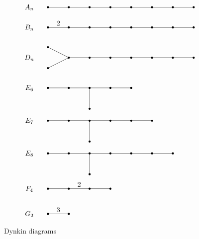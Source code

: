 \documentclass[letterpaper]{amsart}
\numberwithin{equation}{section}
\theoremstyle{definition}
\begin{document}
\begin{figure}[ht] 
\vspace{-.2in} 
\[ 
\begin{array}{ccl} 
A_n && 
\setlength{\unitlength}{1.5pt} 
\begin{picture}(140,17)(0,-2) 
\put(0,0){\line(1,0){140}} 
\multiput(0,0)(20,0){8}{\circle*{2}} 
\end{picture}\\%
B_n%
&& 
\setlength{\unitlength}{1.5pt} 
\begin{picture}(140,17)(0,-2) 
\put(0,0){\line(1,0){140}} 
\multiput(0,0)(20,0){8}{\circle*{2}} 
\put(10,4){\makebox(0,0){$2$}} 
\end{picture} 
\\[.2in] 
D_n 
&& 
\setlength{\unitlength}{1.5pt} 
\begin{picture}(140,17)(0,-2) 
\put(20,0){\line(1,0){120}} 
\put(0,10){\line(2,-1){20}} 
\put(0,-10){\line(2,1){20}} 
\multiput(20,0)(20,0){7}{\circle*{2}} 
\put(0,10){\circle*{2}} 
\put(0,-10){\circle*{2}} 
\end{picture} 
\\[.2in] 
E_6 
&& 
\setlength{\unitlength}{1.5pt} 
\begin{picture}(140,17)(0,-2) 
\put(0,0){\line(1,0){80}} 
\put(40,0){\line(0,-1){20}} 
\put(40,-20){\circle*{2}} 
\multiput(0,0)(20,0){5}{\circle*{2}} 
\end{picture} 
\\[.25in] 
E_7 
&& 
\setlength{\unitlength}{1.5pt} 
\begin{picture}(140,17)(0,-2) 
\put(0,0){\line(1,0){100}} 
\put(40,0){\line(0,-1){20}} 
\put(40,-20){\circle*{2}} 
\multiput(0,0)(20,0){6}{\circle*{2}} 
\end{picture} 
\\[.25in] 
E_8 
&& 
\setlength{\unitlength}{1.5pt} 
\begin{picture}(140,17)(0,-2) 
\put(0,0){\line(1,0){120}} 
\put(40,0){\line(0,-1){20}} 
\put(40,-20){\circle*{2}} 
\multiput(0,0)(20,0){7}{\circle*{2}} 
\end{picture} 
\\[.3in] 
F_4 
&& 
\setlength{\unitlength}{1.5pt} 
\begin{picture}(140,17)(0,-2) 
\put(0,0){\line(1,0){60}} 
\multiput(0,0)(20,0){4}{\circle*{2}} 
\put(30,4){\makebox(0,0){$2$}} 
\end{picture} 
\\[.1in] 
G_2 
&& 
\setlength{\unitlength}{1.5pt} 
\begin{picture}(140,17)(0,-2) 
\put(0,0){\line(1,0){20}} 
\multiput(0,0)(20,0){2}{\circle*{2}} 
\put(10,4){\makebox(0,0){$3$}} 
\end{picture} 
\end{array} 
\] 
\vspace{-.1in} 
\caption{Dynkin diagrams} 
\label{fig:dynkin-diagrams} 
\end{figure} 
 
\end{document}
